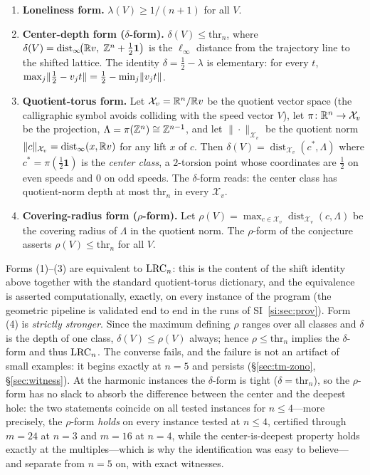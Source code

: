 \begin{enumerate}[leftmargin=1.6em,itemsep=2pt]
\item \textbf{Loneliness form.} $\lambda(V)\ge 1/(n+1)$ for all $V$.
\item \textbf{Center-depth form ($\delta$-form).}
$\delta(V)\le \mathrm{thr}_n$, where
$\delta(V)=\operatorname{dist}_\infty\!\bigl(\mathbb{R} v,\;\mathbb{Z}^n+\tfrac12\mathbf{1}\bigr)$
is the $\ell_\infty$ distance from the trajectory line to the shifted
lattice. The identity
$\delta=\tfrac12-\lambda$ is elementary: for every $t$,
$\max_j \lVert \tfrac12-v_jt \rVert=\tfrac12-\min_j\lVert v_jt \rVert$.
\item \textbf{Quotient-torus form.} Let $\mathcal{X}_v=\mathbb{R}^n/\mathbb{R} v$ be
the quotient vector space (the calligraphic symbol avoids colliding with
the speed vector $V$), let $\pi\colon\mathbb{R}^n\to\mathcal{X}_v$ be the
projection, $\Lambda=\pi(\mathbb{Z}^n)\cong\mathbb{Z}^{n-1}$, and let
$\|\cdot\|_{\mathcal{X}_v}$ be the quotient norm
$\|c\|_{\mathcal{X}_v}=\operatorname{dist}_\infty(x,\mathbb{R} v)$ for any lift
$x$ of $c$. Then $\delta(V)=\operatorname{dist}_{\mathcal{X}_v}(c^*,\Lambda)$
where $c^*=\pi(\tfrac12\mathbf{1})$ is the \emph{center class}, a
$2$-torsion point whose coordinates are $\tfrac12$ on even speeds and $0$
on odd speeds. The $\delta$-form reads: the center class has quotient-norm
depth at most $\mathrm{thr}_n$ in every $\mathcal{X}_v$.
\item \textbf{Covering-radius form ($\rho$-form).}
Let $\rho(V)=\max_{c\in\mathcal{X}_v}\operatorname{dist}_{\mathcal{X}_v}(c,
\Lambda)$ be the covering radius of $\Lambda$ in the quotient norm. The
$\rho$-form of the conjecture asserts $\rho(V)\le\mathrm{thr}_n$ for all
$V$.
\end{enumerate}

Forms (1)--(3) are equivalent to $\mathrm{LRC}_n$: this is the content of the
shift identity above together with the standard quotient-torus dictionary,
and the equivalence is asserted computationally, exactly, on every
instance of the program (the geometric pipeline is validated end to end
in the runs of SI~\ref{si:sec:prov}). Form (4) is \emph{strictly
stronger}. Since the maximum defining $\rho$ ranges over all classes and
$\delta$ is the depth of one class, $\delta(V)\le\rho(V)$ always; hence
$\rho\le\mathrm{thr}_n$ implies the $\delta$-form and thus $\mathrm{LRC}_n$. The
converse fails, and the failure is not an artifact of small examples: it
begins exactly at $n=5$ and persists (\S\ref{sec:tm-zono},
\S\ref{sec:witness}). At the harmonic instances the $\delta$-form is
tight ($\delta=\mathrm{thr}_n$), so the $\rho$-form has no slack to
absorb the difference between the center and the deepest hole: the
two statements coincide on all tested instances for $n\le 4$---more
precisely, the $\rho$-form \emph{holds} on every instance tested at
$n\le 4$, certified through $m=24$ at $n=3$ and $m=16$ at $n=4$, while
the center-is-deepest property holds exactly at the multiples---which is
why the identification was easy to believe---and separate from $n=5$ on,
with exact witnesses.


